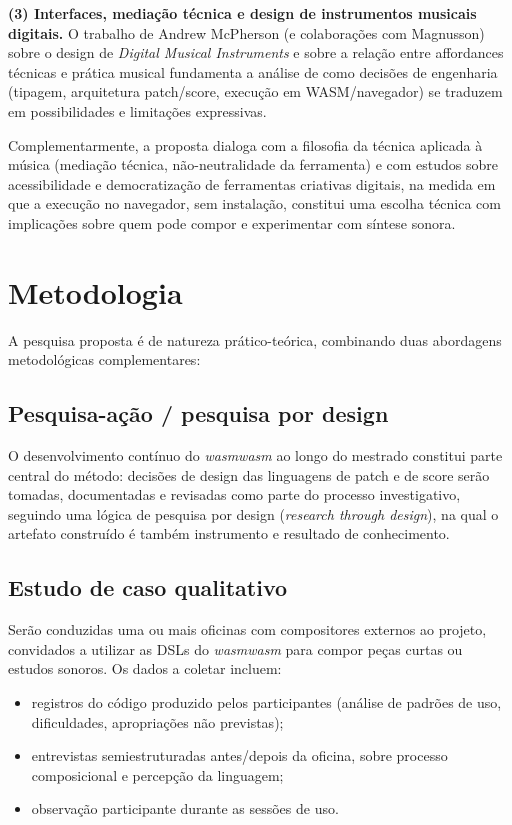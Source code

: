 \documentclass[12pt,a4paper]{article}
\begin{document}
\textbf{(3) Interfaces, mediação técnica e design de instrumentos musicais digitais.} O trabalho de Andrew McPherson (e colaborações com Magnusson) sobre o design de \emph{Digital Musical Instruments} e sobre a relação entre affordances técnicas e prática musical fundamenta a análise de como decisões de engenharia (tipagem, arquitetura patch/score, execução em WASM/navegador) se traduzem em possibilidades e limitações expressivas.

Complementarmente, a proposta dialoga com a filosofia da técnica aplicada à música (mediação técnica, não-neutralidade da ferramenta) e com estudos sobre acessibilidade e democratização de ferramentas criativas digitais, na medida em que a execução no navegador, sem instalação, constitui uma escolha técnica com implicações sobre quem pode compor e experimentar com síntese sonora.

\section{Metodologia}

A pesquisa proposta é de natureza prático-teórica, combinando duas abordagens metodológicas complementares:

\subsection{Pesquisa-ação / pesquisa por design}

O desenvolvimento contínuo do \emph{wasmwasm} ao longo do mestrado constitui parte central do método: decisões de design das linguagens de patch e de score serão tomadas, documentadas e revisadas como parte do processo investigativo, seguindo uma lógica de pesquisa por design (\emph{research through design}), na qual o artefato construído é também instrumento e resultado de conhecimento.

\subsection{Estudo de caso qualitativo}

Serão conduzidas uma ou mais oficinas com compositores externos ao projeto, convidados a utilizar as DSLs do \emph{wasmwasm} para compor peças curtas ou estudos sonoros. Os dados a coletar incluem:

\begin{itemize}
  \item registros do código produzido pelos participantes (análise de padrões de uso, dificuldades, apropriações não previstas);
  \item entrevistas semiestruturadas antes/depois da oficina, sobre processo composicional e percepção da linguagem;
  \item observação participante durante as sessões de uso.
\end{itemize}
\end{document}
